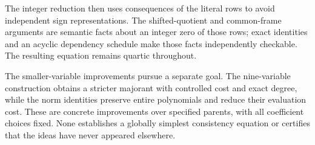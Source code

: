 \documentclass[11pt,letterpaper]{article}
\theoremstyle{definition}
\theoremstyle{remark}
\begin{document}
The integer reduction then uses consequences of the literal rows to
avoid independent sign representations. The shifted-quotient and
common-frame arguments are semantic facts about an integer zero
of those rows; exact identities and an acyclic dependency schedule
make those facts independently checkable. The resulting equation
remains quartic throughout.

The smaller-variable improvements pursue a separate goal. The
nine-variable construction obtains a stricter majorant with controlled
cost and exact degree, while the norm identities preserve entire
polynomials and reduce their evaluation cost. These are concrete
improvements over specified parents, with all coefficient choices
fixed. None establishes a globally simplest consistency equation or
certifies that the ideas have never appeared elsewhere.
\end{document}
